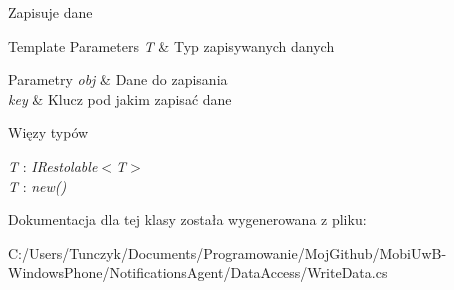 Zapisuje dane 


\begin{DoxyTemplParams}{Template Parameters}
{\em T} & Typ zapisywanych danych\\
\hline
\end{DoxyTemplParams}

\begin{DoxyParams}{Parametry}
{\em obj} & Dane do zapisania\\
\hline
{\em key} & Klucz pod jakim zapisać dane\\
\hline
\end{DoxyParams}
\begin{Desc}
\item[Więzy typów]\begin{description}
\item[{\em T} : {\em I\+Restolable$<$T$>$}]\item[{\em T} : {\em new()}]\end{description}
\end{Desc}


Dokumentacja dla tej klasy została wygenerowana z pliku\+:\begin{DoxyCompactItemize}
\item 
C\+:/\+Users/\+Tunczyk/\+Documents/\+Programowanie/\+Moj\+Github/\+Mobi\+Uw\+B-\/\+Windows\+Phone/\+Notifications\+Agent/\+Data\+Access/Write\+Data.\+cs\end{DoxyCompactItemize}
